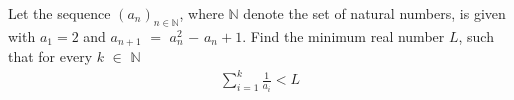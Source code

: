 Let the sequence $(a_n)_{n \in \mathbb{N}}$, where $\mathbb{N}$ denote the set of natural numbers, is given with $a_1=2$ and $a_{n+1}$ $=$ $a_n^2$ $-$ $a_n+1$. Find the minimum real number $L$, such that for every $k$ $\in$ $\mathbb{N}$
\begin{align*} \sum_{i=1}^k \frac{1}{a_i} < L \end{align*}